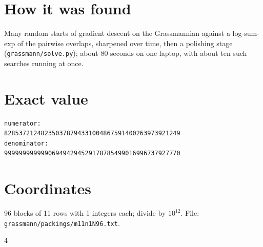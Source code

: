 \documentclass[11pt,a4paper]{article}
\begin{document}
\section{How it was found}
Many random starts of gradient descent on the Grassmannian against a log-sum-exp of the pairwise overlaps, sharpened over time, then a polishing stage (\texttt{grassmann/solve.py}); about 80 seconds on one laptop, with about ten such searches running at once.


\appendix
\section{Exact value}
{\small
\begin{verbatim}
numerator:
828537212482350378794331004867591400263973921249
denominator:
999999999999069494294529178785499016996737927770
\end{verbatim}}

\section{Coordinates}
96 blocks of 11 rows with 1 integers each; divide by $10^{12}$. File: \texttt{grassmann/packings/m11n1N96.txt}.
{\tiny
\begin{multicols}{4}
\end{multicols}}
\end{document}
